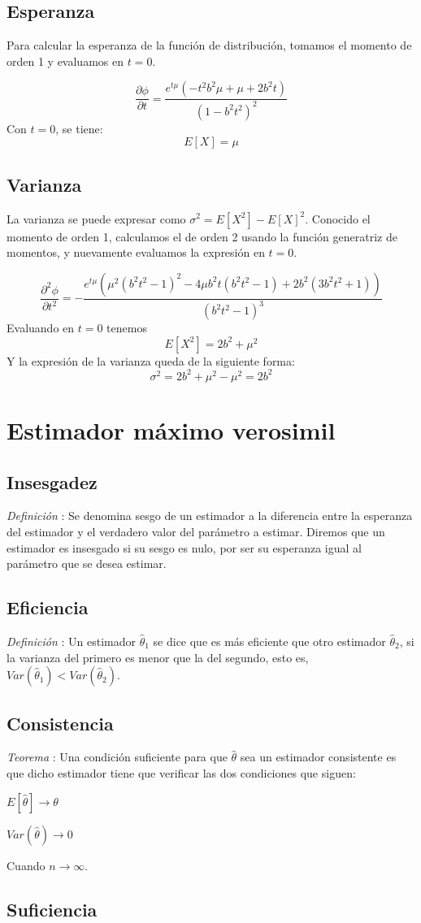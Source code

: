 \documentclass[a4paper, 10pt]{article} %
\newcounter{def}
\newcounter{teo}
\begin{document}
\subsection{Esperanza}

Para calcular la esperanza de la función de distribución, tomamos el momento de orden 1 y evaluamos en $t = 0$. 

$$\frac{\partial\phi}{\partial t} = \frac{e^{t\mu} (-t^2 b^2\mu + \mu + 2b^2t)}{(1-b^2 t^2)^2}$$
Con $t = 0$, se tiene: 
$$E[X]=\mu$$

\subsection{Varianza}

La varianza se puede expresar como $\sigma^2 = E[X^2] - E[X]^2$. Conocido el momento de orden 1, calculamos el de orden 2 usando la función generatriz de momentos, y nuevamente evaluamos la expresión en $t = 0$.

$$\frac{\partial^2\phi}{\partial t^2} = -\frac{e^{t\mu}(\mu^2(b^2 t^2 -1)^2 -4\mu b^2 t(b^2 t^2 -1)+2b^2(3b^2 t^2+1))}{(b^2 t^2 -1)^3}$$
Evaluando en $t = 0$ tenemos
$$E[X^2]=2b^2 + \mu^2$$
Y la expresión de la varianza queda de la siguiente forma:
$$\sigma^2=2b^2 + \mu^2 - \mu^2=2b^2$$
\section{Estimador máximo verosimil}

\subsection{Insesgadez}
\addtocounter{def}{1}
\emph{Definición }: Se denomina sesgo de un estimador a la diferencia entre la esperanza del estimador
y el verdadero valor del parámetro a estimar. Diremos que un estimador es insesgado si su sesgo es nulo, por ser
su esperanza igual al parámetro que se desea estimar.

\subsection{Eficiencia}
\addtocounter{def}{1}
\emph{Definición }: Un estimador $\hat{\theta}_1$ se dice que es más eficiente que otro estimador
$\hat{\theta}_2$, si la varianza del primero es menor que la del segundo, esto es,  $Var(\hat{\theta}_1)<Var(\hat{\theta}_2)$.

\subsection{Consistencia}
\addtocounter{teo}{1}
\emph{Teorema }: Una condición suficiente para que $\hat{\theta}$ sea un estimador consistente es que
dicho estimador tiene que verificar las dos condiciones que siguen:

\begin{description}
\item $E[\hat{\theta}] \rightarrow \theta$
\item $Var(\hat{\theta}) \rightarrow 0$
\end{description}
Cuando $n \rightarrow \infty$.

\subsection{Suficiencia}
\end{document}
